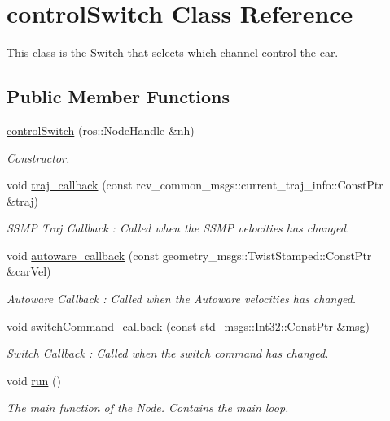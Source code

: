 \hypertarget{classcontrolSwitch}{}\section{control\+Switch Class Reference}
\label{classcontrolSwitch}


This class is the Switch that selects which channel control the car.  


\subsection*{Public Member Functions}
\begin{DoxyCompactItemize}
\item 
\hyperlink{classcontrolSwitch_a8205c46a1fc329fbf2e2f9c973505fcb}{control\+Switch} (ros\+::\+Node\+Handle \&nh)
\begin{DoxyCompactList}\small\item\em Constructor. \end{DoxyCompactList}\item 
void \hyperlink{classcontrolSwitch_a1500999ae9e898eb74268c7f122fc71a}{traj\+\_\+callback} (const rcv\+\_\+common\+\_\+msgs\+::current\+\_\+traj\+\_\+info\+::\+Const\+Ptr \&traj)
\begin{DoxyCompactList}\small\item\em S\+S\+MP Traj Callback \+: Called when the S\+S\+MP velocities has changed. \end{DoxyCompactList}\item 
void \hyperlink{classcontrolSwitch_a5cfee30e42e7daa0c0c3ca1161b7ea13}{autoware\+\_\+callback} (const geometry\+\_\+msgs\+::\+Twist\+Stamped\+::\+Const\+Ptr \&car\+Vel)
\begin{DoxyCompactList}\small\item\em Autoware Callback \+: Called when the Autoware velocities has changed. \end{DoxyCompactList}\item 
void \hyperlink{classcontrolSwitch_adc4f5d2629e3c5ee7b2f87a308066bc0}{switch\+Command\+\_\+callback} (const std\+\_\+msgs\+::\+Int32\+::\+Const\+Ptr \&msg)
\begin{DoxyCompactList}\small\item\em Switch Callback \+: Called when the switch command has changed. \end{DoxyCompactList}\item 
void \hyperlink{classcontrolSwitch_a8ff7cb526a5f0e5961fca446ae3d897d}{run} ()
\begin{DoxyCompactList}\small\item\em The main function of the Node. Contains the main loop. \end{DoxyCompactList}\end{DoxyCompactItemize}


